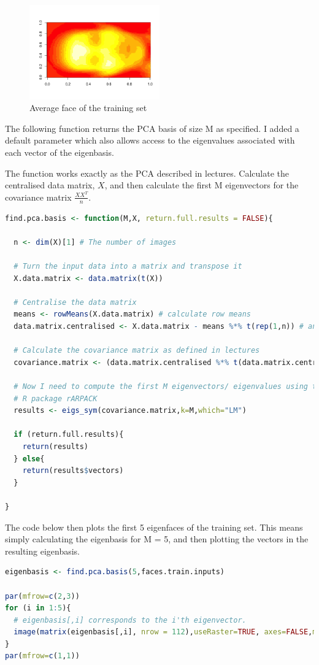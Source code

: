 \documentclass[12pt]{article}
\begin{document}
\newpage
\begin{figure}
\caption{Average face of the training set}
\centering
\includegraphics[width=0.5\textwidth]{average}
\end{figure}

The following function returns the PCA basis of size M as specified. I added a default parameter which also allows access to the eigenvalues associated with each vector of the eigenbasis.

The function works exactly as the PCA described in lectures. Calculate the centralised data matrix, $X$, and then calculate the first M eigenvectors for the covariance matrix $\frac{XX^{T}}{n}$.

\begin{lstlisting}[linewidth=18.4cm,language=R]
find.pca.basis <- function(M,X, return.full.results = FALSE){

  n <- dim(X)[1] # The number of images
  
  # Turn the input data into a matrix and transpose it
  X.data.matrix <- data.matrix(t(X))
  
  # Centralise the data matrix
  means <- rowMeans(X.data.matrix) # calculate row means
  data.matrix.centralised <- X.data.matrix - means %*% t(rep(1,n)) # and subtract
  
  # Calculate the covariance matrix as defined in lectures
  covariance.matrix <- (data.matrix.centralised %*% t(data.matrix.centralised)) / n
  
  # Now I need to compute the first M eigenvectors/ eigenvalues using the 
  # R package rARPACK
  results <- eigs_sym(covariance.matrix,k=M,which="LM")
  
  if (return.full.results){
    return(results)
  } else{
    return(results$vectors)
  }
  
}
\end{lstlisting}

\newpage
The code below then plots the first 5 eigenfaces of the training set. This means simply calculating the eigenbasis for M = 5, and then plotting the vectors in the resulting eigenbasis.
\begin{lstlisting}[linewidth=18.4cm,language=R]
eigenbasis <- find.pca.basis(5,faces.train.inputs)

par(mfrow=c(2,3))
for (i in 1:5){
  # eigenbasis[,i] corresponds to the i'th eigenvector.
  image(matrix(eigenbasis[,i], nrow = 112),useRaster=TRUE, axes=FALSE,main=i)
}
par(mfrow=c(1,1))
\end{lstlisting}
\end{document}
